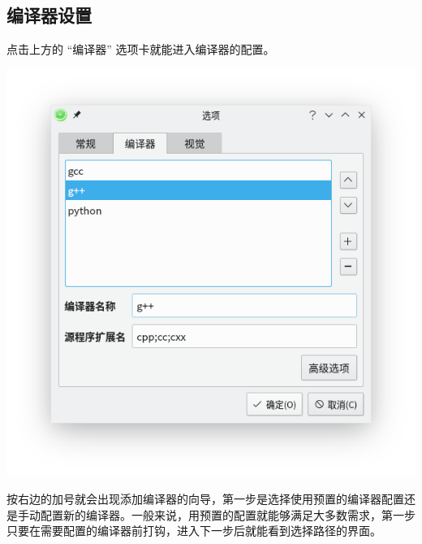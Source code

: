 \documentclass[UTF-8]{ctexart}
\begin{document}
			\subsection{编译器设置}

				点击上方的 “编译器” 选项卡就能进入编译器的配置。

				\begin{center}
					\includegraphics[scale=0.7]{pics/compilersettings.png}
				\end{center}

				按右边的加号就会出现添加编译器的向导，第一步是选择使用预置的编译器配置还是手动配置新的编译器。一般来说，用预置的配置就能够满足大多数需求，第一步只要在需要配置的编译器前打钩，进入下一步后就能看到选择路径的界面。
\end{document}
